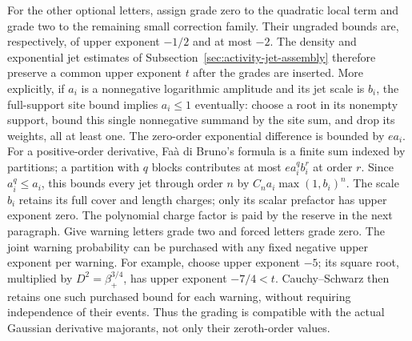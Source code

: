 For the other optional letters, assign grade zero to the quadratic
local term and grade two to the remaining small correction family.
Their ungraded bounds are, respectively, of upper exponent $-1/2$
and at most $-2$. The density and exponential jet estimates of
Subsection~\ref{sec:activity-jet-assembly} therefore preserve a common
upper exponent $t$ after the grades are inserted. More explicitly,
if $a_i$ is a nonnegative logarithmic amplitude and its jet scale is
$b_i$, the full-support site bound implies $a_i\le1$ eventually:
choose a root in its nonempty support, bound this single nonnegative
summand by the site sum, and drop its weights, all at least one.
The zero-order exponential difference is bounded by $e a_i$.
For a positive-order derivative, Fa\`a di Bruno's formula is a finite
sum indexed by partitions; a partition with $q$ blocks contributes
at most $e a_i^q b_i^r$ at order $r$. Since $a_i^q\le a_i$, this
bounds every jet through order $n$ by
$C_n a_i\max(1,b_i)^n$. The scale $b_i$ retains its full cover and
length charges; only its scalar prefactor has upper exponent zero.
The polynomial charge factor is paid by the reserve in the next
paragraph.
Give warning letters grade two and forced letters grade zero. The joint
warning probability can be purchased with any fixed negative upper exponent
per warning. For example, choose upper exponent $-5$; its square root,
multiplied by $D^2=\beta_+^{3/4}$, has upper exponent $-7/4<t$.
Cauchy--Schwarz
then retains one such purchased bound for each warning, without requiring
independence of their events. Thus the grading is compatible with
the actual Gaussian derivative majorants, not only their zeroth-order
values.

